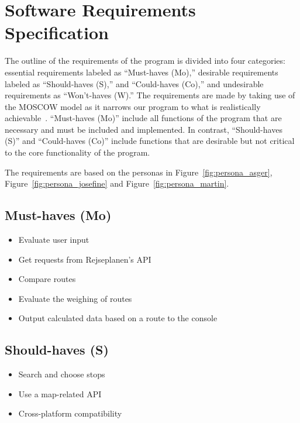 \section{Software Requirements Specification}\label{sec:software-requirements-specification}

The outline of the requirements of the program is divided into four categories: essential requirements labeled as
``Must-haves (Mo),'' desirable requirements labeled as ``Should-haves (S),'' and ``Could-haves (Co),'' and
undesirable requirements as ``Won't-haves (W).''
The requirements are made by taking use of the MOSCOW model as it narrows our program to what is realistically
achievable~\cite{hudaib2018requirements}.
``Must-haves (Mo)'' include all functions of the program that are necessary and must be included and implemented. In
contrast, ``Should-haves (S)'' and ``Could-haves (Co)'' include functions that are desirable but not critical to
the core functionality of the program.

The requirements are based on the personas in Figure~\ref{fig:persona_asger},~ Figure~\ref{fig:persona_josefine} and
Figure~\ref{fig:persona_martin}.

\subsection{Must-haves (Mo)}\label{subsec:must-haves}

\begin{itemize}
    \item Evaluate user input
    \item Get requests from Rejseplanen’s API
    \item Compare routes
    \item Evaluate the weighing of routes
    \item Output calculated data based on a route to the console
\end{itemize}

\subsection{Should-haves (S)}\label{subsec:should-haves}

\begin{itemize}
    \item Search and choose stops
    \item Use a map-related API
    \item Cross-platform compatibility
\end{itemize}

